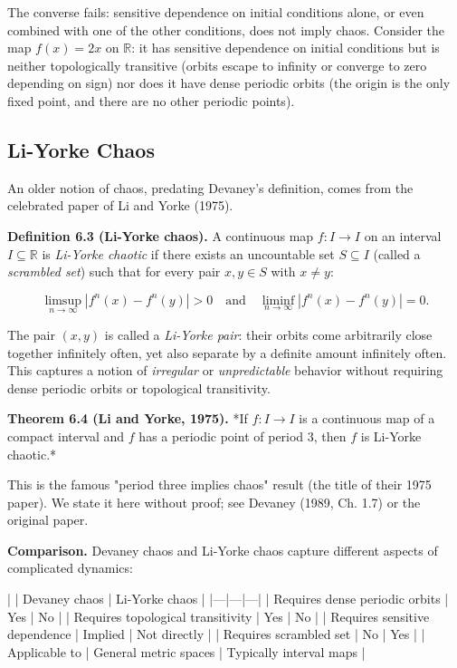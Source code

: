 \begin{remark}
The converse fails: sensitive dependence on initial conditions alone, or even combined with one of the other conditions, does not imply chaos. Consider the map $f(x) = 2x$ on $\mathbb{R}$: it has sensitive dependence on initial conditions but is neither topologically transitive (orbits escape to infinity or converge to zero depending on sign) nor does it have dense periodic orbits (the origin is the only fixed point, and there are no other periodic points).
\end{remark}


\subsection{Li-Yorke Chaos}\label{sec:6.1.2}

An older notion of chaos, predating Devaney's definition, comes from the celebrated paper of Li and Yorke (1975).

\textbf{Definition 6.3 (Li-Yorke chaos).} A continuous map $f: I \to I$ on an interval $I \subseteq \mathbb{R}$ is \textit{Li-Yorke chaotic} if there exists an uncountable set $S \subseteq I$ (called a \textit{scrambled set}) such that for every pair $x, y \in S$ with $x \neq y$:

\[
\limsup_{n \to \infty} |f^n(x) - f^n(y)| > 0 \quad \text{and} \quad \liminf_{n \to \infty} |f^n(x) - f^n(y)| = 0.
\]

The pair $(x, y)$ is called a \textit{Li-Yorke pair}: their orbits come arbitrarily close together infinitely often, yet also separate by a definite amount infinitely often. This captures a notion of \textit{irregular} or \textit{unpredictable} behavior without requiring dense periodic orbits or topological transitivity.

\textbf{Theorem 6.4 (Li and Yorke, 1975).} *If $f: I \to I$ is a continuous map of a compact interval and $f$ has a periodic point of period 3, then $f$ is Li-Yorke chaotic.*

This is the famous "period three implies chaos" result (the title of their 1975 paper). We state it here without proof; see Devaney (1989, Ch. 1.7) or the original paper.

\textbf{Comparison.} Devaney chaos and Li-Yorke chaos capture different aspects of complicated dynamics:

| | Devaney chaos | Li-Yorke chaos |
|---|---|---|
| Requires dense periodic orbits | Yes | No |
| Requires topological transitivity | Yes | No |
| Requires sensitive dependence | Implied | Not directly |
| Requires scrambled set | No | Yes |
| Applicable to | General metric spaces | Typically interval maps |

